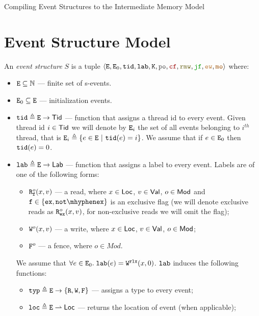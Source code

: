 \documentclass[12pt]{article}
\begin{document}
\begin{center}
{\center \LARGE Compiling Event Structures to the Intermediate Memory Model }
\end{center}

\section{Event Structure Model}

\begin{definition}
  \label{def:es}
  
  An \emph{event structure} $S$ is a tuple
  $\tup{\lE, \lEo, \lTID, \lLAB, \lCONT, \lPO, \lCF, \lRMW, \lJF, \lEW, \lMO}$ where:
  \begin{itemize}
  \item $\lE \subseteq \N$ --- finite set of s-events. 
  \item $\lEo \subseteq \lE$ --- initialization events.
  \item $\lTID \defeq \lE \fun \Tid$ --- function that assigns a thread id to every event.
    Given thread id $i \in \Tid$ we will denote by $\lEi{i}$ the set of all events belonging 
    to $i^{th}$ thread, that is $\lEi{i} \defeq \{e \in \lE ~|~ \lTID(e) = i\}$.
    We assume that if $e \in \lEo$ then $\lTID(e) = 0$.
  \item $\lLAB \defeq \lE \fun \Lab$ --- function that assigns a label to every event.
    Labels are of one of the following forms:
    \begin{itemize}
      \item $\rlabExExpl{o}{x}{v}{\mathtt{f}}$ --- a read, where
        $x \in \Loc$, $v \in \Val$, $o \in \Mod$ 
        and $\mathtt{f} \in \{\Ex, \NotEx\}$ is an exclusive flag 
        (we will denote exclusive reads as $\rlabEx{o}{x}{v}$,
        for non-exclusive reads we will omit the flag);
      \item $\wlab{o}{x}{v}$ --- a write, where $x \in \Loc$, $v \in \Val$, $o \in \Mod$;
      \item $\flab{o}$ --- a fence, where $o \in Mod$.
    \end{itemize}
    We assume that $\forall{e} \in \lEo. \; \lLAB(e) = \wlab{\rlx}{x}{0}$.
    $\lLAB$ induces the following functions:
    \begin{itemize}
      \item $\lTYP \defeq \lE \fun \{\lR, \lW, \lF\}$ --- assigns a type to every event;
      \item $\lLOC \defeq \lE \pfun \Loc $ --- returns the location of event (when applicable);

\end{itemize}
\end{itemize}
\end{definition}
\end{document}
